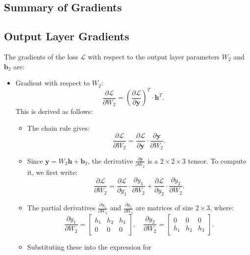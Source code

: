 \begin{notechapter}
\section{Summary of Gradients}

\subsection{Output Layer Gradients}

The gradients of the loss \( \mathcal{L} \) with respect to the 
output layer parameters \( W_2 \) and \( \mathbf{b}_2 \) are:

\begin{itemize}
    \item Gradient with respect to \( W_2 \):
    \[
    \frac{\partial \mathcal{L}}{\partial W_2} = 
    \left( \frac{\partial \mathcal{L}}{\partial \mathbf{y}} \right)^T 
    \cdot \mathbf{h}^T.
    \]
    This is derived as follows:
    \begin{itemize}
        \item The chain rule gives:
        \[
        \frac{\partial \mathcal{L}}{\partial W_2} = 
        \frac{\partial \mathcal{L}}{\partial \mathbf{y}} 
        \cdot \frac{\partial \mathbf{y}}{\partial W_2}.
        \]
        \item Since \( \mathbf{y} = W_2 \mathbf{h} + \mathbf{b}_2 \), the 
        derivative \( \frac{\partial \mathbf{y}}{\partial W_2} \) is a 
        \( 2 \times 2 \times 3 \) tensor. To compute it, we first write:
        \[
        \frac{\partial \mathcal{L}}{\partial W_2} = 
        \frac{\partial \mathcal{L}}{\partial y_1} \cdot 
        \frac{\partial y_1}{\partial W_2} + 
        \frac{\partial \mathcal{L}}{\partial y_2} \cdot 
        \frac{\partial y_2}{\partial W_2}.
        \]
        \item The partial derivatives \( \frac{\partial y_1}{\partial W_2} \) 
        and \( \frac{\partial y_2}{\partial W_2} \) are matrices of size 
        \( 2 \times 3 \), where:
        \[
        \frac{\partial y_1}{\partial W_2} = 
        \begin{bmatrix}
        h_1 & h_2 & h_3 \\
        0 & 0 & 0
        \end{bmatrix}, \quad
        \frac{\partial y_2}{\partial W_2} = 
        \begin{bmatrix}
        0 & 0 & 0 \\
        h_1 & h_2 & h_3
        \end{bmatrix}.
        \]
        \item Substituting these into the expression for 

\end{itemize}
\end{itemize}
\end{notechapter}
